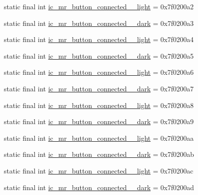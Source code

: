 \begin{CompactItemize}
\item 
static final int \hyperlink{classandroid_1_1support_1_1v7_1_1palette_1_1_r_1_1drawable_45daa6a91c9e4159ba1d2ccc493cab9e}{ic\_\-mr\_\-button\_\-connected\_\_\-light} = 0x7f0200a2
\item 
static final int \hyperlink{classandroid_1_1support_1_1v7_1_1palette_1_1_r_1_1drawable_6cd2f633cf3a87137d391ca76e27efce}{ic\_\-mr\_\-button\_\-connected\_\_\-dark} = 0x7f0200a3
\item 
static final int \hyperlink{classandroid_1_1support_1_1v7_1_1palette_1_1_r_1_1drawable_493c4123bc867f57dff0b2a7a7d685d9}{ic\_\-mr\_\-button\_\-connected\_\_\-light} = 0x7f0200a4
\item 
static final int \hyperlink{classandroid_1_1support_1_1v7_1_1palette_1_1_r_1_1drawable_8c00b088060f369f3b0f77e249587a92}{ic\_\-mr\_\-button\_\-connected\_\_\-dark} = 0x7f0200a5
\item 
static final int \hyperlink{classandroid_1_1support_1_1v7_1_1palette_1_1_r_1_1drawable_b56ed000007c901d3da29608831296d1}{ic\_\-mr\_\-button\_\-connected\_\_\-light} = 0x7f0200a6
\item 
static final int \hyperlink{classandroid_1_1support_1_1v7_1_1palette_1_1_r_1_1drawable_04f6dc964d40bb0cb6856bcd95cbfb81}{ic\_\-mr\_\-button\_\-connected\_\_\-dark} = 0x7f0200a7
\item 
static final int \hyperlink{classandroid_1_1support_1_1v7_1_1palette_1_1_r_1_1drawable_c3acf54f429bd24510672d164cf93f23}{ic\_\-mr\_\-button\_\-connected\_\_\-light} = 0x7f0200a8
\item 
static final int \hyperlink{classandroid_1_1support_1_1v7_1_1palette_1_1_r_1_1drawable_044293998cc085c0752212b087d4055b}{ic\_\-mr\_\-button\_\-connected\_\_\-dark} = 0x7f0200a9
\item 
static final int \hyperlink{classandroid_1_1support_1_1v7_1_1palette_1_1_r_1_1drawable_74f28ddacc276e459d25070cbac8c1b2}{ic\_\-mr\_\-button\_\-connected\_\_\-light} = 0x7f0200aa
\item 
static final int \hyperlink{classandroid_1_1support_1_1v7_1_1palette_1_1_r_1_1drawable_4f325d9c79edc33abf67760f9cef04e7}{ic\_\-mr\_\-button\_\-connected\_\_\-dark} = 0x7f0200ab
\item 
static final int \hyperlink{classandroid_1_1support_1_1v7_1_1palette_1_1_r_1_1drawable_36e1642cb59f27eb9fbaae595a39f6f7}{ic\_\-mr\_\-button\_\-connected\_\_\-light} = 0x7f0200ac
\item 
static final int \hyperlink{classandroid_1_1support_1_1v7_1_1palette_1_1_r_1_1drawable_443646e172c062ee3b8e7d636b9ca5fa}{ic\_\-mr\_\-button\_\-connected\_\_\-dark} = 0x7f0200ad

\end{CompactItemize}

